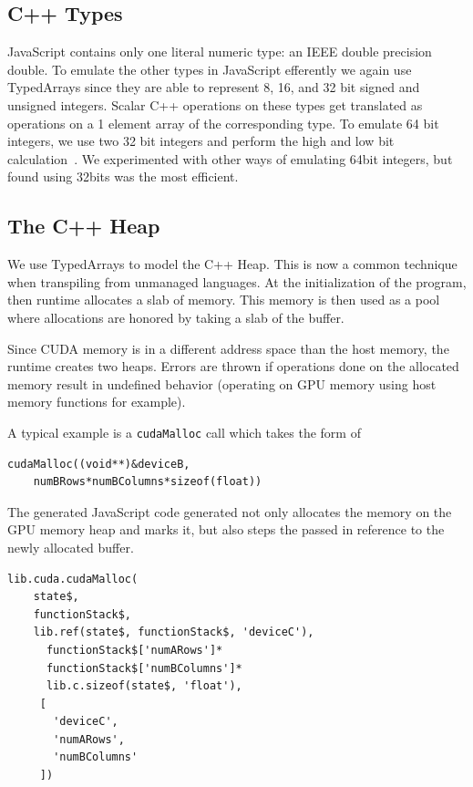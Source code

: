 \documentclass[nocopyrightspace]{sigchi}
\begin{document}
\subsection{C++ Types}

JavaScript contains only one literal numeric type: an IEEE double 
precision double. To emulate the other types in JavaScript efferently we
again use TypedArrays since they are able to represent 8, 16, and 32 bit
signed and unsigned integers. Scalar C++ operations on these types get
translated as operations on a 1 element array of the corresponding type.
To emulate 64 bit integers, we use two 32 bit integers and perform the
high and low bit calculation~\cite{warren2013hacker}.
We experimented with other ways of emulating 64bit integers, but found 
using 32bits was the most efficient.

\subsection{The C++ Heap}

We use TypedArrays to model the C++ Heap. This is now a common technique 
when transpiling from unmanaged languages. At the initialization of the 
program, then runtime allocates a slab of memory. This memory is then
used as a pool where allocations are honored by taking a slab of the 
buffer.

Since CUDA memory is in a different address space than the host memory,
the runtime creates two heaps. Errors are thrown if operations done on
the allocated memory result in undefined behavior (operating on GPU
memory using host memory functions for example).

A typical example is a {\tt cudaMalloc} call which takes the form of

\begin{verbatim}
cudaMalloc((void**)&deviceB,
    numBRows*numBColumns*sizeof(float))
\end{verbatim}

The generated JavaScript code generated not only allocates the memory
on the GPU memory heap and marks it, but also steps the passed in
reference to the newly allocated buffer.

\begin{verbatim}
lib.cuda.cudaMalloc(
	state$,
	functionStack$,
	lib.ref(state$, functionStack$, 'deviceC'),
	  functionStack$['numARows']*
	  functionStack$['numBColumns']*
	  lib.c.sizeof(state$, 'float'),
	 [
	   'deviceC',
	   'numARows',
	   'numBColumns'
	 ])
\end{verbatim}
\end{document}
